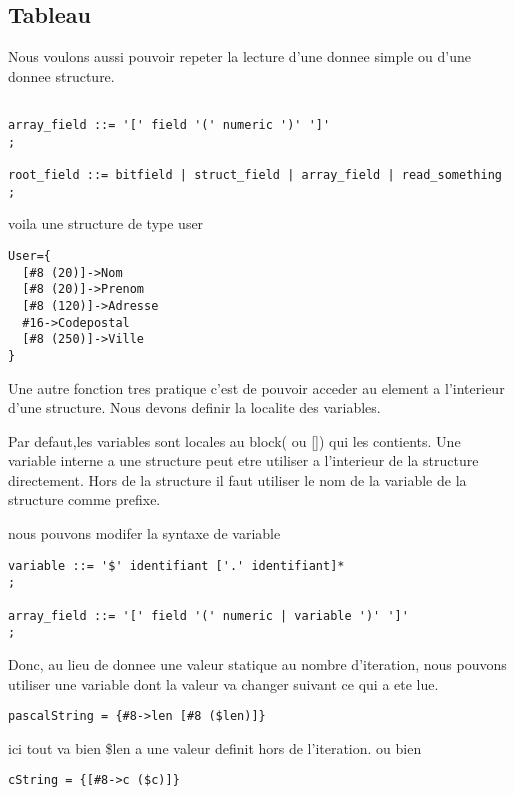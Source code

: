 \documentclass[11pt]{report}
\begin{document}
\subsection{Tableau}

Nous voulons aussi pouvoir repeter la lecture d'une donnee simple ou d'une donnee structure.

\begin{lstlisting}

array_field ::= '[' field '(' numeric ')' ']'
;

root_field ::= bitfield | struct_field | array_field | read_something
;
\end{lstlisting}

voila une structure de type user

\begin{lstlisting}
User={
  [#8 (20)]->Nom
  [#8 (20)]->Prenom
  [#8 (120)]->Adresse
  #16->Codepostal
  [#8 (250)]->Ville
}
\end{lstlisting}

Une autre fonction tres pratique c'est de pouvoir acceder au element a l'interieur d'une structure. 
Nous devons definir la localite des variables.

Par defaut,les variables sont locales au block({} ou []) qui les contients. 
Une variable interne a une structure peut etre utiliser a l'interieur de la structure directement.
Hors de la structure il faut utiliser le nom de la variable de la structure comme prefixe.

nous pouvons modifer la syntaxe de variable

\begin{lstlisting}
variable ::= '$' identifiant ['.' identifiant]*  
;

array_field ::= '[' field '(' numeric | variable ')' ']'
;
\end{lstlisting}%

Donc, au lieu de donnee une valeur statique au nombre d'iteration, nous pouvons utiliser une variable
dont la valeur va changer suivant ce qui a ete lue.

\begin{lstlisting}
pascalString = {#8->len [#8 ($len)]}
\end{lstlisting}%

ici tout va bien \$len a une valeur definit hors de l'iteration.
ou bien

\begin{lstlisting}
cString = {[#8->c ($c)]}
\end{lstlisting}%
\end{document}
